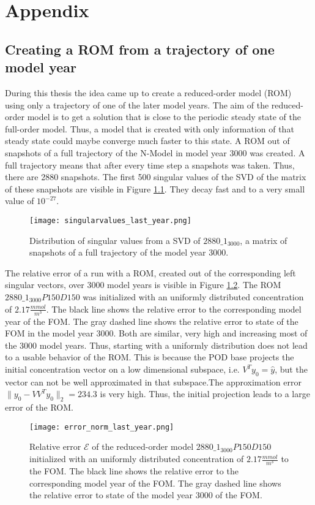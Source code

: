 \chapter{Appendix}

\section{Creating a ROM from a trajectory of one model year}\label{A:last_year}
During this thesis the idea came up to create a reduced-order model (ROM) using only a trajectory of one of the later model years.
The aim of the reduced-order model is to get a solution that is close to the periodic steady state of the full-order model. Thus, a model that is created with only information of that steady state could maybe converge much faster to this state.
A ROM out of snapshots of a full trajectory of the N-Model in model year 3000 was created. A full trajectory means that after every time step a snapshots was taken. Thus, there are 2880 snapshots. The first 500 singular values of the SVD of the matrix of these snapshots
are visible in Figure \ref{fig:singularvalues_last_year}. They decay fast and to a very small value of $10^{-27}$.
\begin{figure}[ht]
\centering
  \texttt{[image: singularvalues\_last\_year.png]}
  \caption{Distribution of singular values from a SVD of $2880\_1_{3000}$, a matrix of snapshots of a full trajectory of the model year 3000.}
  \label{fig:singularvalues_last_year}
\end{figure}
The relative error of a run with a ROM, created out of the corresponding left singular vectors, over 3000 model years is visible in Figure \ref{fig:error_norm_last_year}.
The ROM $2880\_1_{3000}P150D150$ was initialized with an uniformly distributed concentration of $2.17 \frac{mmol}{m^3}$. The black line shows the relative error to the corresponding model year of the FOM.
The gray dashed line shows the relative error to state of the FOM in the model year 3000. Both are similar, very high and increasing most of the 3000 model years. Thus, starting with a uniformly distribution
does not lead to a usable behavior of the ROM. This is because the POD base projects the initial concentration vector on a low dimensional subspace, i.e. $V^Ty_0 = \hat{y}$, but the vector can not be well approximated in that
subspace.The approximation error $\parallel y_0 - VV^Ty_0 \parallel_2 = 234.3$ is very high. Thus, the initial projection leads to a large error of the ROM. 
\begin{figure}[ht]
\centering
  \texttt{[image: error\_norm\_last\_year.png]}
  \caption[Relative error $\mathcal{E}$ of the reduced-order model $2880\_1_{3000}P150D150$ initialized with an uniformly distributed concentration to the FOM.]{Relative error $\mathcal{E}$ of the reduced-order model $2880\_1_{3000}P150D150$
	    initialized with an uniformly distributed concentration of $2.17 \frac{mmol}{m^3}$ to the FOM. The black line shows the relative error to the corresponding model year of the FOM.
	    The gray dashed line shows the relative error to state of the model year 3000 of the FOM.}
  \label{fig:error_norm_last_year}
\end{figure}
